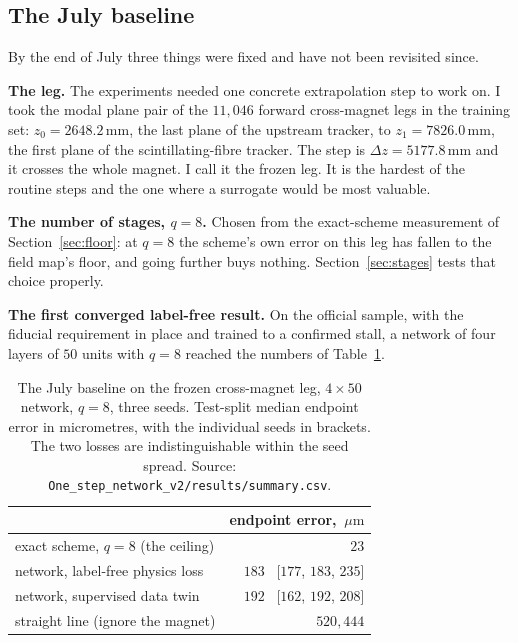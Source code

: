 \documentclass[11pt,a4paper]{article}
\newcommand{\um}{\ensuremath{\,\mu\mathrm{m}}}
\newcommand{\mm}{\ensuremath{\,\mathrm{mm}}}
\begin{document}
\subsection{The July baseline}
\label{sec:baseline}

By the end of July three things were fixed and have not been revisited since.

\textbf{The leg.} The experiments needed one concrete extrapolation step to work
on. I took the modal plane pair of the $11{,}046$ forward cross-magnet legs in
the training set: $z_0 = 2648.2\mm$, the last plane of the upstream tracker, to
$z_1 = 7826.0\mm$, the first plane of the scintillating-fibre tracker. The step
is $\Delta z = 5177.8\mm$ and it crosses the whole magnet. I call it the frozen
leg. It is the hardest of the routine steps and the one where a surrogate would
be most valuable.

\textbf{The number of stages, $q = 8$.} Chosen from the exact-scheme measurement
of Section~\ref{sec:floor}: at $q = 8$ the scheme's own error on this leg has
fallen to the field map's floor, and going further buys nothing.
Section~\ref{sec:stages} tests that choice properly.

\textbf{The first converged label-free result.} On the official sample, with the
fiducial requirement in place and trained to a confirmed stall, a network of
four layers of $50$ units with $q = 8$ reached the numbers of
Table~\ref{tab:baseline}.

\begin{table}[tbp]
  \centering
  \caption{The July baseline on the frozen cross-magnet leg, $4 \times 50$
  network, $q = 8$, three seeds. Test-split median endpoint error in
  micrometres, with the individual seeds in brackets. The two losses are
  indistinguishable within the seed spread. Source:
  \texttt{One\_step\_network\_v2/results/summary.csv}.}
  \label{tab:baseline}
  \small
  \begin{tabular}{lr}
    \toprule
    & endpoint error, $\um$ \\
    \midrule
    exact scheme, $q = 8$ (the ceiling) & $23$ \\
    network, label-free physics loss & $183$ \ [$177$, $183$, $235$] \\
    network, supervised data twin & $192$ \ [$162$, $192$, $208$] \\
    straight line (ignore the magnet) & $520{,}444$ \\
    \bottomrule
  \end{tabular}
\end{table}
\end{document}

